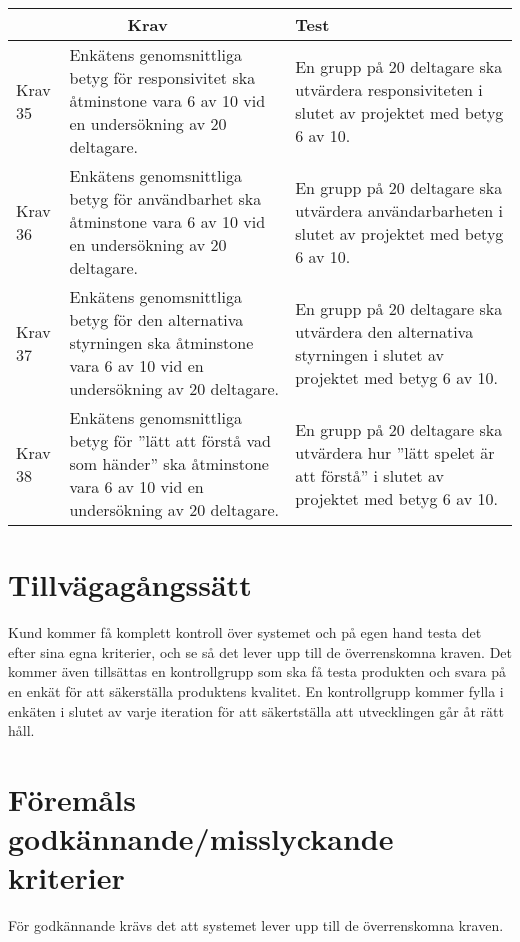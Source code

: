 	\begin{tabular}{| p{1.5cm} | p{6cm} | p{8cm}|}

  \hline
    \multicolumn{2}{|c|}{Krav}&{Test}\\
    \hline


		Krav 35& Enkätens\cite {bib-kvalitetsplan} genomsnittliga betyg för responsivitet ska åtminstone vara 6 av 10 vid en undersökning av 20 deltagare. & En grupp på 20 deltagare ska utvärdera responsiviteten i slutet av projektet med betyg 6 av 10. \\
		\hline
		Krav 36& Enkätens\cite {bib-kvalitetsplan} genomsnittliga betyg för användbarhet ska åtminstone vara 6 av 10 vid en undersökning av 20 deltagare. & En grupp på 20 deltagare ska utvärdera användarbarheten i slutet av projektet med betyg 6 av 10. \\
		\hline
		Krav 37& Enkätens\cite {bib-kvalitetsplan} genomsnittliga betyg för den alternativa styrningen ska åtminstone vara 6 av 10 vid en undersökning av 20 deltagare. & En grupp på 20 deltagare ska utvärdera den alternativa styrningen i slutet av projektet med betyg 6 av 10. \\
		\hline
		Krav 38&Enkätens\cite{bib-kvalitetsplan} genomsnittliga betyg för ''lätt att förstå vad som händer'' ska åtminstone vara 6 av 10 vid en undersökning av 20 deltagare. & En grupp på 20 deltagare ska utvärdera hur ''lätt spelet är att förstå'' i slutet av projektet med betyg 6 av 10. \\
		\hline


  \end{tabular}



\section{Tillvägagångssätt}
	Kund kommer få komplett kontroll över systemet och på egen hand testa det efter sina egna kriterier, och se så det lever upp till de överrenskomna kraven. Det kommer även tillsättas en kontrollgrupp som ska få testa produkten och svara på en enkät för att säkerställa produktens kvalitet. En kontrollgrupp kommer fylla i enkäten i slutet av varje iteration för att säkertställa att utvecklingen går åt rätt håll.



\section{Föremåls godkännande/misslyckande kriterier}
	För godkännande krävs det att systemet lever upp till de överrenskomna kraven.



